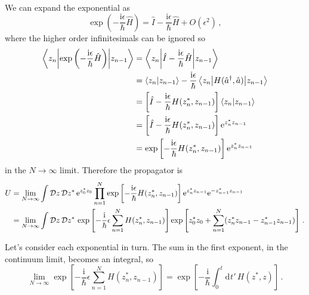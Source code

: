 \documentclass{article}
\theoremstyle{plain}\theoremheaderfont{\normalfont\itshape}\theorembodyfont{\rmfamily}\theoremseparator{.}\newtheorem*{rem}{Remark}\newtheorem*{ex}{Example}\newtheorem*{proof}{Proof}\newtheorem*{altp}{Alternative proof}
\theoremstyle{plain}\theoremheaderfont{\normalfont\bfseries}\theorembodyfont{\rmfamily}\theoremseparator{.}\newtheorem{thm}{Theorem}[section]\newtheorem{lem}[thm]{Lemma}\newtheorem{prop}[thm]{Proposition}\newtheorem*{cor}{Corollary}\newtheorem{defn}[thm]{Definition}\newtheorem{clm}[thm]{Claim}\newtheorem{clminproof}{Claim}
\theoremstyle{break}\theoremheaderfont{\normalfont\itshape}\theorembodyfont{\rmfamily}\theoremseparator{.\medskip}\newtheorem*{proofskip}{Proof}\newtheorem*{exs}{Examples}\newtheorem*{rems}{Remarks}
\theoremstyle{break}\theoremheaderfont{\normalfont\bfseries}\theorembodyfont{\rmfamily}\theoremseparator{.\medskip}\newtheorem{lemskip}[thm]{Lemma}\newtheorem{defnskip}[thm]{Definition}\newtheorem{propskip}[thm]{Proposition}\newtheorem{thmskip}[thm]{Theorem}
\numberwithin{equation}{section}
\newcommand{\ii}{\mathrm{i}}
\newcommand{\ee}{\mathrm{e}}
\newcommand{\dd}[2][]{\mathrm{d}^{#1} #2\,}
\newcommand{\DD}[1]{\mathcal{D} #1\,}
\newcommand{\braket}[2]{\left\langle #1 \middle| #2 \right\rangle}
\newcommand{\mel}[3]{\left\langle #1 \middle| #2 \middle| #3 \right\rangle}
\newcommand{\rai}{\hat{a}^\dagger}
\newcommand{\low}{\hat{a}}
\begin{document}
    We can expand the exponential as
    \begin{equation}
        \exp\left(-\frac{\ii\epsilon}{\hbar}\hat{H}\right)=\hat{I}-\frac{\ii\epsilon}{\hbar}\hat{H}+O(\epsilon^2)\,,
    \end{equation}
    where the higher order infinitesimals can be ignored so
    \begin{align}
        \mel{z_n}{\exp\left(-\frac{\ii\epsilon}{\hbar}\hat{H}\right)}{z_{n-1}}&=\mel{z_n}{\hat{I}-\frac{\ii\epsilon}{\hbar}\hat{H}}{z_{n-1}}\notag \\
        &=\braket{z_n}{z_{n-1}}-\frac{\ii\epsilon}{\hbar}\mel{z_n}{H(\rai,\low)}{z_{n-1}}\notag \\
        &=\left[\hat{I}-\frac{\ii\epsilon}{\hbar}H(z_n^*,z_{n-1})\right]\braket{z_n}{z_{n-1}}\notag \\
        &=\left[\hat{I}-\frac{\ii\epsilon}{\hbar}H(z_n^*,z_{n-1})\right]\ee^{z_n^* z_{n-1}}\notag \\
        &=\exp\left[-\frac{\ii\epsilon}{\hbar}H(z_n^*,z_{n-1})\right]\ee^{z_n^* z_{n-1}}
    \end{align}
    in the \(N\to\infty\) limit. Therefore the propagator is
    \begin{align}
        U&=\lim_{N\to\infty}\int\DD{z}\DD{z^*} \ee^{z_0^* z_0}\prod_{n=1}^{N}\exp\left[-\frac{\ii\epsilon}{\hbar}H(z_n^*,z_{n-1})\right]\ee^{z_n^* z_{n-1}}\ee^{-z_{n-1}^* z_{n-1}}\notag \\
        &=\lim_{N\to\infty}\int\DD{z}\DD{z^*}\exp\left[-\frac{\ii}{\hbar}\epsilon\sum_{n=1}^{N}H(z_n^*,z_{n-1})\right]\exp\left[z_0^* z_0+\sum_{n=1}^{N}(z_n^* z_{n-1} - z_{n-1}^* z_{n-1})\right]\,.
    \end{align}

    Let's consider each exponential in turn. The sum in the first exponent, in the continuum limit, becomes an integral, so
    \begin{equation}
        \lim_{N\to\infty}\exp\left[-\frac{\ii}{\hbar}\epsilon\sum_{n=1}^{N}H(z_n^*,z_{n-1})\right]=\exp\left[-\frac{\ii}{\hbar}\int_{0}^{t}\dd{t'}H(z^*,z)\right]\,.
    \end{equation}
\end{document}
